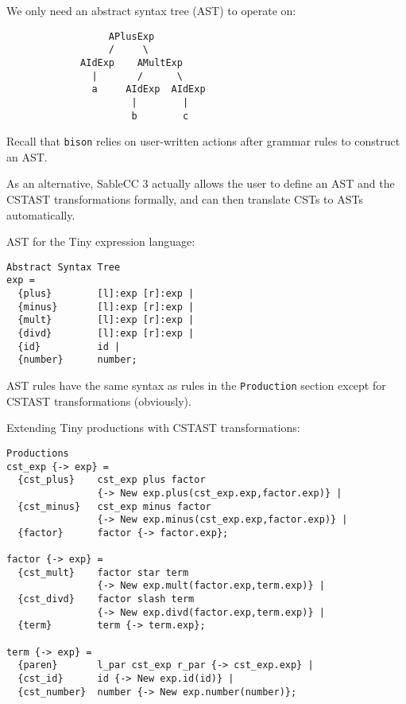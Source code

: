 \begin{slide*}
We only need an abstract syntax tree (AST) to operate on:

\begin{scriptsize}
\begin{verbatim}
                  APlusExp
                  /     \
             AIdExp    AMultExp
               |       /      \
               a     AIdExp  AIdExp
                      |        |
                      b        c
\end{verbatim}
\end{scriptsize}

Recall that {\tt bison} relies on user-written actions after grammar
rules to construct an AST.

As an alternative, SableCC 3 actually allows the user to define an AST
and the CST\RA{}AST transformations formally, and can then translate
CSTs to ASTs automatically.
\vfil
\end{slide*}

\begin{slide*}
AST for the Tiny expression language:

\begin{scriptsize}
\begin{verbatim}
Abstract Syntax Tree
exp = 
  {plus}        [l]:exp [r]:exp |
  {minus}       [l]:exp [r]:exp |
  {mult}        [l]:exp [r]:exp |
  {divd}        [l]:exp [r]:exp |
  {id}          id |
  {number}      number;
\end{verbatim}
\end{scriptsize}

AST rules have the same syntax as rules in the {\tt Production}
section except for CST\RA{}AST transformations (obviously).
\vfil
\end{slide*}

\begin{slide*}
Extending Tiny productions with CST\RA{}AST transformations:

\begin{scriptsize}
\begin{verbatim}
Productions
cst_exp {-> exp} = 
  {cst_plus}    cst_exp plus factor 
                {-> New exp.plus(cst_exp.exp,factor.exp)} |
  {cst_minus}   cst_exp minus factor 
                {-> New exp.minus(cst_exp.exp,factor.exp)} |
  {factor}      factor {-> factor.exp};

factor {-> exp} =
  {cst_mult}    factor star term 
                {-> New exp.mult(factor.exp,term.exp)} |
  {cst_divd}    factor slash term 
                {-> New exp.divd(factor.exp,term.exp)} |
  {term}        term {-> term.exp};

term {-> exp} =
  {paren}       l_par cst_exp r_par {-> cst_exp.exp} |
  {cst_id}      id {-> New exp.id(id)} |
  {cst_number}  number {-> New exp.number(number)};
\end{verbatim}
\end{scriptsize}

\vfil
\end{slide*}


